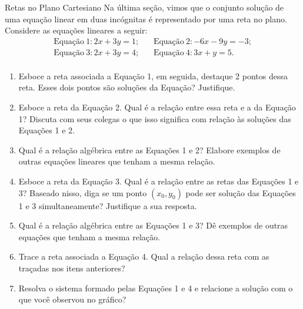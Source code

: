 \begin{task}{Retas no Plano Cartesiano}
\label{retas}
Na última seção, vimos que o conjunto solução de uma equação linear em duas incógnitas é representado por uma reta no plano. Considere as equações lineares a seguir:
\begin{align*}
\mbox{Equação} \ 1: 2x+3y=1;   &   \ \ \ \  \mbox{Equação} \ 2: -6x - 9y = -3;\\
\mbox{Equação}\ 3: 2x+3y=4;    & \ \ \ \ \mbox{Equação} \ 4: 3x + y = 5. \\
\end{align*}
\begin{enumerate}
\item{} 
Esboce a reta associada a Equação 1, em seguida, destaque 2 pontos dessa reta. Esses dois pontos são soluções da Equação? Justifique.

\item{}
Esboce a reta da Equação 2. Qual é a relação entre essa reta e a da Equação 1? Discuta com seus colegas o que isso significa com relação às soluções das Equações 1 e 2.

\item{}
Qual é a relação algébrica entre as Equações 1 e 2? Elabore exemplos de outras equações lineares que tenham a mesma relação.

\item{}
Esboce a reta da Equação 3. Qual é a relação entre as retas das Equações 1 e 3? Baseado nisso, diga se um ponto $(x_0,y_0)$ pode ser solução das Equações 1 e 3 simultaneamente? Justifique a sua resposta.

\item{}
Qual é a relação algébrica entre as Equações 1 e 3? Dê exemplos de outras equações que tenham a mesma relação.

\item{}
Trace a reta associada a Equação 4. Qual a relação dessa reta com as traçadas nos itens anteriores?

\item{}
Resolva o sistema formado pelas Equações 1 e 4 e relacione a solução com o que você observou no gráfico?

\end{enumerate}


\end{task}



\label{\detokenize{AF107-4:posiçoes-relativas}}\label{\detokenize{AF107-4::doc}}

